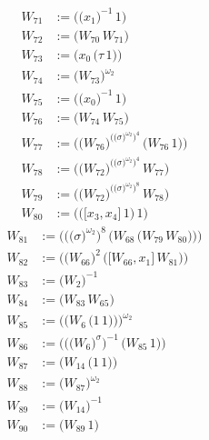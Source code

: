 \begin{align*}
W_{71} &:= \bigl(\bigl(x_{1}\bigr)^{-1}\,1\bigr) \\
W_{72} &:= \bigl(W_{70}\,W_{71}\bigr) \\
W_{73} &:= \bigl(x_{0}\,\bigl(\tau\,1\bigr)\bigr) \\
W_{74} &:= \bigl(W_{73}\bigr)^{\omega_2} \\
W_{75} &:= \bigl(\bigl(x_{0}\bigr)^{-1}\,1\bigr) \\
W_{76} &:= \bigl(W_{74}\,W_{75}\bigr) \\
W_{77} &:= \bigl(\bigl(W_{76}\bigr)^{\bigl(\bigl(\sigma\bigr)^{\omega_2}\bigr)^{4}}\,\bigl(W_{76}\,1\bigr)\bigr) \\
W_{78} &:= \bigl(\bigl(W_{72}\bigr)^{\bigl(\bigl(\sigma\bigr)^{\omega_2}\bigr)^{4}}\,W_{77}\bigr) \\
W_{79} &:= \bigl(\bigl(W_{72}\bigr)^{\bigl(\bigl(\sigma\bigr)^{\omega_2}\bigr)^{8}}\,W_{78}\bigr) \\
W_{80} &:= \bigl(\bigl(\bigl[x_{3},x_{4}\bigr]\,1\bigr)\,1\bigr)
\end{align*}
\begin{align*}
W_{81} &:= \bigl(\bigl(\bigl(\sigma\bigr)^{\omega_2}\bigr)^{8}\,\bigl(W_{68}\,\bigl(W_{79}\,W_{80}\bigr)\bigr)\bigr) \\
W_{82} &:= \bigl(\bigl(W_{66}\bigr)^{2}\,\bigl(\bigl[W_{66},x_{1}\bigr]\,W_{81}\bigr)\bigr) \\
W_{83} &:= \bigl(W_{2}\bigr)^{-1} \\
W_{84} &:= \bigl(W_{83}\,W_{65}\bigr) \\
W_{85} &:= \bigl(\bigl(W_{6}\,\bigl(1\,1\bigr)\bigr)\bigr)^{\omega_2} \\
W_{86} &:= \bigl(\bigl(\bigl(W_{6}\bigr)^{\sigma}\bigr)^{-1}\,\bigl(W_{85}\,1\bigr)\bigr) \\
W_{87} &:= \bigl(W_{14}\,\bigl(1\,1\bigr)\bigr) \\
W_{88} &:= \bigl(W_{87}\bigr)^{\omega_2} \\
W_{89} &:= \bigl(W_{14}\bigr)^{-1} \\
W_{90} &:= \bigl(W_{89}\,1\bigr)
\end{align*}
